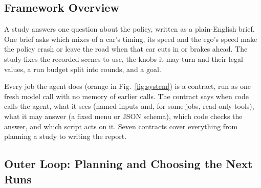 \documentclass[conference]{IEEEtran}
\newcommand{\guide}[1]{}
\begin{document}
\subsection{Framework Overview}\label{sec:overview}
\guide{Present Fig.~\ref{fig:system} as a whole: a brief comes in, a checked plan sets up a study, the outer loop picks each round of runs, the inner loop runs, checks and heals every run, kept outcomes go back to the goal check, and once the goal is met each failure is explained and a report answers the brief. Explain the colors: orange boxes are the agent, which only proposes; blue boxes are plain code, which checks every proposal and acts on it; grey is a person (who writes the brief, approves the plan, enacts a new rule and takes over a halted run). Define a campaign and a study (scenes, knobs, goal, budget). Then the design rule shared by every orange box: a contract with five parts (when code calls it, what it sees, what it may answer from a fixed menu or schema, who checks the answer, and who acts: a script, never the agent). Leave the concrete simulator and scenarios to Sec.~\ref{sec:setup}.}

A study answers one question about the policy, written as a plain-English brief. One brief asks which mixes of a car's timing, its speed and the ego's speed make the policy crash or leave the road when that car cuts in or brakes ahead. The study fixes the recorded scenes to use, the knobs it may turn and their legal values, a run budget split into rounds, and a goal.

Every job the agent does (orange in Fig.~\ref{fig:system}) is a contract, run as one fresh model call with no memory of earlier calls. The contract says when code calls the agent, what it sees (named inputs and, for some jobs, read-only tools), what it may answer (a fixed menu or JSON schema), which code checks the answer, and which script acts on it. Seven contracts cover everything from planning a study to writing the report.

\subsection{Outer Loop: Planning and Choosing the Next Runs}\label{sec:outer}
\guide{The top band of Fig.~\ref{fig:system}, left to right. The planner turns the brief into scenes, knobs, rounds and a goal, and code checks the plan before a person approves it. The proposer (rules, a baseline, or the agent) picks each round; every proposed run is checked before it is queued (a candidate scene, legal knob values) and anything else is dropped. Kept outcomes return to the goal check: define a confirmed hardest case precisely (a setting whose failure rate is surely above one half, by a confidence interval over its repeats, at most one per scene), since Sec.~\ref{sec:results} counts them. List the search methods that can act as the proposer (rules, random search with repeats, Optuna~\cite{akiba2019optuna} with repeats, and the agent alone or combined with either), all under the same gate and budget.}
\end{document}
